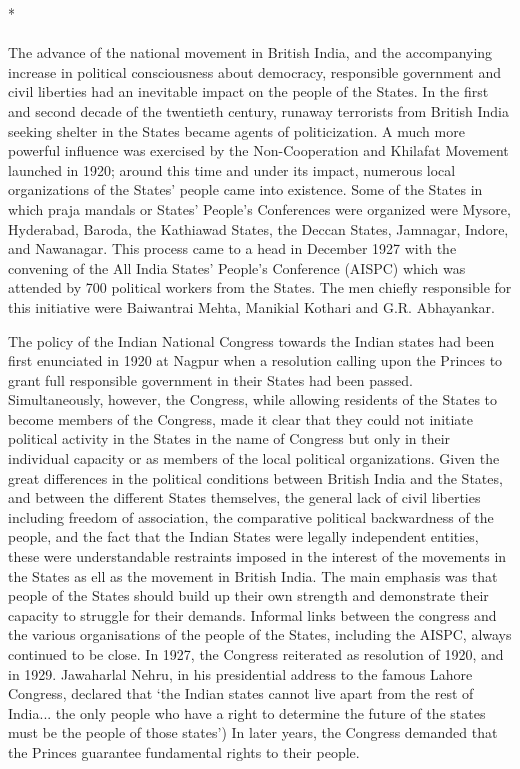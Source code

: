 \begin{center}*\end{center}

\paragraph*{}


The advance of the national movement in British India, and the accompanying increase in political consciousness about democracy, responsible government and civil liberties had an inevitable impact on the people of the States. In the first and second decade of the twentieth century, runaway terrorists from British India seeking shelter in the States became agents of politicization. A much more powerful influence was exercised by the Non-Cooperation and Khilafat Movement launched in 1920; around this time and under its impact, numerous local organizations of the States' people came into existence. Some of the States in which praja mandals or States' People's Conferences were organized were Mysore, Hyderabad, Baroda, the Kathiawad States, the Deccan States, Jamnagar, Indore, and Nawanagar. This process came to a head in December 1927 with the convening of the All India States' People's Conference (AISPC) which was attended by 700 political workers from the States. The men chiefly responsible for this initiative were Baiwantrai Mehta, Manikial Kothari and G.R. Abhayankar. 

The policy of the Indian National Congress towards the Indian states had been first enunciated in 1920 at Nagpur when a resolution calling upon the Princes to grant full responsible government in their States had been passed. Simultaneously, however, the Congress, while allowing residents of the States to become members of the Congress, made it clear that they could not initiate political activity in the States in the name of Congress but only in their individual capacity or as members of the local political organizations. Given the great differences in the political conditions between British India and the States, and between the different States themselves, the general lack of civil liberties including freedom of association, the comparative political backwardness of the people, and the fact that the Indian States were legally independent entities, these were understandable restraints imposed in the interest of the movements in the States as ell as the movement in British India. The main emphasis was that people of the States should build up their own strength and demonstrate their capacity to struggle for their demands. Informal links between the congress and the various organisations of the people of the States, including the AISPC, always continued to be close. In 1927, the Congress reiterated as resolution of 1920, and in 1929. Jawaharlal Nehru, in his presidential address to the famous Lahore Congress, declared that `the Indian states cannot live apart from the rest of India... the only people who have a right to determine the future of the states must be the people of those states') In later years, the Congress demanded that the Princes guarantee fundamental rights to their people. 

